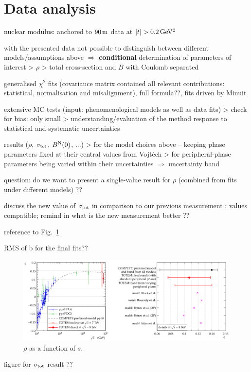 \section{Data analysis}
\label{sec:cni_anal}

\> nuclear modulus: anchored to $90\,{\rm m}$ data at $|t| > 0.2\,{\rm GeV^2}$

\> with the presented data not possible to distinguish between different models/assumptions above $\Rightarrow$ {\bf conditional} determination of parameters of interest
\>> $\rho$
\>> total cross-section and $B$ with Coulomb separated


\> generalised $\chi^2$ fits (covariance matrix contained all relevant contributions: statistical, normalisation and misalignment), full formula??, fits driven by Minuit

\> extensive MC tests (input: phenomenological models as well as data fits)
\>> check for bias: only small
\>> understanding/evaluation of the method response to statistical and systematic uncertainties

\> results ($\rho$, $\sigma_{\rm tot}$, $B^{\rm N}(0)$, ...)
\>> for the model choices above -- keeping phase parameters fixed at their central values from Vojt\v ech
\>> for peripheral-phase parameters being varied within their uncertainties $\Rightarrow$ uncertainty band

\> question: do we want to present a single-value result for $\rho$ (combined from fits under different models) ??

\> discuss the new value of $\sigma_{\rm tot}$ in comparison to our previous measurement \cite{prl111}; values compatible; remind in what is the new measurement better ??

\> reference to Fig.~\ref{fig:rho_s}

\> RMS of b for the final fits??

\begin{figure}
\begin{center}
\includegraphics[width=16cm]{fig/rho_s.pdf}
\vskip-3mm
\caption{$\rho$ as a function of $s$.}
\label{fig:rho_s}
\end{center}
\end{figure}

\> figure for $\sigma_{\rm tot}$ result ?? 
